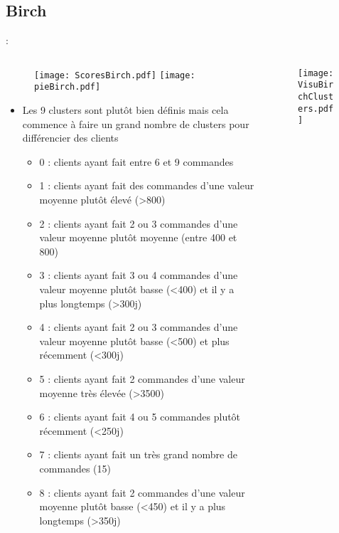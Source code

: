 \documentclass[8pt,aspectratio=169,hyperref={unicode=true}]{beamer}
\begin{document}
\subsection{Birch}
\begin{frame}{\insertsection: \insertsubsection}
    \begin{columns}
        \begin{column}{.55\textwidth}
            \begin{figure}
                \hfill
                \texttt{[image: ScoresBirch.pdf]}
                \hfill
                \texttt{[image: pieBirch.pdf]}
                \hfill
            \end{figure}
            \begin{itemize}
                \footnotesize
                \item Les 9 clusters sont plutôt bien définis mais cela commence à faire un grand nombre de clusters pour différencier des clients
                \begin{itemize}
                    \scriptsize
                    \item 0 : clients ayant fait entre 6 et 9 commandes
                    \item 1 : clients ayant fait des commandes d'une valeur moyenne plutôt élevé (>800)
                    \item 2 : clients ayant fait 2 ou 3 commandes d'une valeur moyenne plutôt moyenne (entre 400 et 800)
                    \item 3 : clients ayant fait 3 ou 4 commandes d'une valeur moyenne plutôt basse (<400) et il y a plus longtemps (>300j)
                    \item 4 : clients ayant fait 2 ou 3 commandes d'une valeur moyenne plutôt basse (<500) et plus récemment (<300j)
                    \item 5 : clients ayant fait 2 commandes d'une valeur moyenne très élevée (>3500)
                    \item 6 : clients ayant fait 4 ou 5 commandes plutôt récemment (<250j)
                    \item 7 : clients ayant fait un très grand nombre de commandes (15)
                    \item 8 : clients ayant fait 2 commandes d'une valeur moyenne plutôt basse (<450) et il y a plus longtemps (>350j)
                \end{itemize}
            \end{itemize}
        \end{column}
        \begin{column}{.45\textwidth}
            \begin{figure}
                \texttt{[image: VisuBirchClusters.pdf]}
            \end{figure}
        \end{column}
    \end{columns}
\end{frame}
\end{document}
